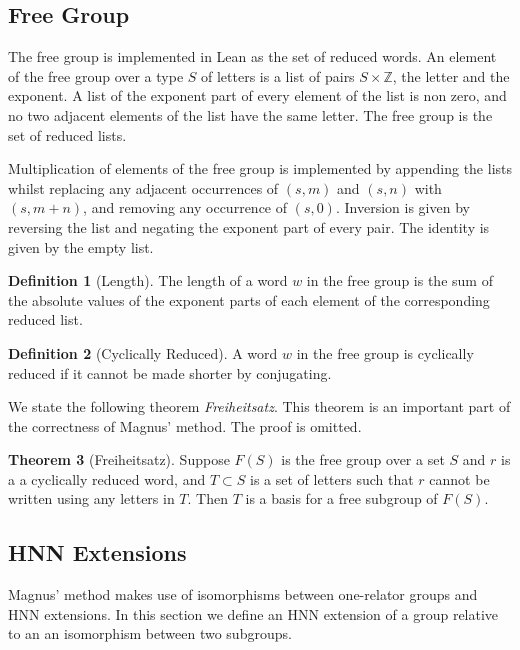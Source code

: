 \documentclass[12pt]{article} %
\theoremstyle{definition}
\newtheorem{theorem}{Theorem}[section]
\theoremstyle{definition}
\theoremstyle{definition}
\theoremstyle{definition}
\theoremstyle{definition}
\newtheorem{defn}[theorem]{Definition}
\theoremstyle{definition}
\begin{document}
\subsection{Free Group}

The free group is implemented in Lean as the set of reduced words. An element of
the free group over a type $S$ of letters is a list of pairs $S \times \mathbb{Z}$,
the letter and the exponent.
A list of the exponent part of every element of the list is non zero, and
no two adjacent elements of the list have the same letter. The free group is the set of
reduced lists.

Multiplication of elements of the free group is implemented by appending the lists
whilst replacing any adjacent occurrences of $(s, m)$ and $(s, n)$ with $(s, m + n)$, and removing
any occurrence of $(s, 0)$. Inversion is given by reversing the list and negating
the exponent part of every pair. The identity is given by the empty list.

\begin{defn}[Length]\label{length}
  The length of a word $w$ in the free group is the sum of the absolute values of the exponent
  parts of each element of the corresponding reduced list.
\end{defn}

\begin{defn}[Cyclically Reduced]\label{cycred}
  A word $w$ in the free group is cyclically reduced if it cannot be made shorter
  by conjugating.
\end{defn}

We state the following theorem \textit{Freiheitsatz}. This theorem is an important
part of the correctness of Magnus' method. The proof is omitted.

\begin{theorem}[Freiheitsatz]\label{freiheitsatz}
  Suppose $F(S)$ is the free group over a set $S$ and $r$ is a a cyclically reduced
  word, and $T \subset S$ is a set of letters such that $r$ cannot be written
  using any letters in $T$. Then $T$ is a basis for a free subgroup of $F(S)$.
  \cite{mccool_schupp_1973}
\end{theorem}

\subsection{HNN Extensions}\label{HNN}

Magnus' method makes use of isomorphisms between one-relator groups and HNN extensions.
In this section we define an HNN extension of a group relative to an
an isomorphism between two subgroups.
\end{document}

